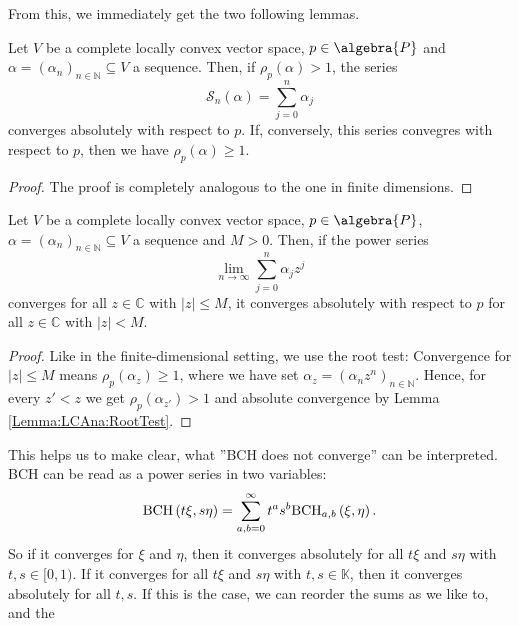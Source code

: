 From this, we immediately get the two following lemmas.
\begin{lemma}
	\label{LCAna:Lemma:RootTest}
	Let $V$ be a complete locally convex vector space, $p \in \algebra{P}$ 
	and $\alpha = (\alpha_n)_{n \in \mathbb{N}} \subseteq V$ a sequence. 
	Then, if $\rho_p(\alpha) > 1$, the series
	\begin{equation*}
		\mathcal{S}_n(\alpha)
		=
		\sum\limits_{j = 0}^n
		\alpha_j
	\end{equation*}
	converges absolutely with respect to $p$. If, conversely, this
	series convegres with respect to $p$, then we have 
	$\rho_p(\alpha) \geq 1$.	
\end{lemma}
\begin{proof}
	The proof is completely analogous to the one in finite dimensions.
\end{proof}
\begin{lemma}
	\label{LCAna:Lemma:PowerSeriesConvAbs}
	Let $V$ be a complete locally convex vector space, $p \in \algebra{P}$, 
	$\alpha = (\alpha_n)_{n \in \mathbb{N}} \subseteq V$ a sequence and
	$M > 0$. Then, if the power series
	\begin{equation*}
		\lim_{n \longrightarrow \infty}
		\sum\limits_{j = 0}^n
		\alpha_j z^j
	\end{equation*}
	converges for all $z \in \mathbb{C}$ with $|z| \leq M$, it converges
	absolutely with respect to $p$ for all $z \in \mathbb{C}$ with $|z| < M$.
\end{lemma}
\begin{proof}
	Like in the finite-dimensional setting, we use the root test: Convergence 
	for $|z| \leq M$ means $\rho_p(\alpha_z) \geq 1$, where we have set 
	$\alpha_z = (\alpha_n z^n)_{n \in \mathbb{N}}$. Hence, for every $z' < z$ 
	we get $\rho_p(\alpha_{z'}) > 1$ and absolute convergence by Lemma 
	\ref{Lemma:LCAna:RootTest}.
\end{proof}
This helps us to make clear, what ''BCH does not converge'' can be 
interpreted. BCH can be read as a power series in two variables:
\begin{equation*}
	\mathrm{BCH}\left(t \xi, s \eta\right)
	=
	\sum\limits_{a,b = 0}^{\infty}
	t^a s^b
	\mathrm{BCH}_{a, b}\left(\xi, \eta\right).
\end{equation*}
So if it converges for $\xi$ and $\eta$, then it converges absolutely for all 
$t \xi$ and $s \eta$ with $t,s \in [0, 1)$. If it converges for all $t \xi$ 
and $s \eta$ with $t, s \in \mathbb{K}$, then it converges absolutely for all 
$t, s$. If this is the case, we can reorder the sums as we like to, and the 
